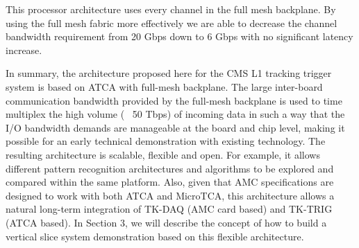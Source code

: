 \noindent This processor architecture uses every channel in the full mesh backplane.  By using the full mesh fabric more effectively we are able to decrease the channel bandwidth requirement from 20 Gbps down to 6 Gbps with no significant latency increase. 

\noindent In summary, the architecture proposed here for the CMS L1 tracking trigger system is based on ATCA with full-mesh backplane. The large inter-board communication bandwidth provided by the full-mesh backplane is used to time multiplex the high volume (~ 50 Tbps) of incoming data in such a way that the I/O bandwidth demands are manageable at the board and chip level, making it possible for an early technical demonstration with existing technology. The resulting architecture is scalable, flexible and open. For example, it allows different pattern recognition architectures and algorithms to be explored and compared within the same platform. Also, given that AMC specifications are designed to work with both ATCA and MicroTCA, this architecture allows a natural long-term integration of TK-DAQ (AMC card based) and TK-TRIG (ATCA based).  In Section 3, we will describe the concept of how to build a vertical slice system demonstration based on this flexible architecture. 























\clearpage
